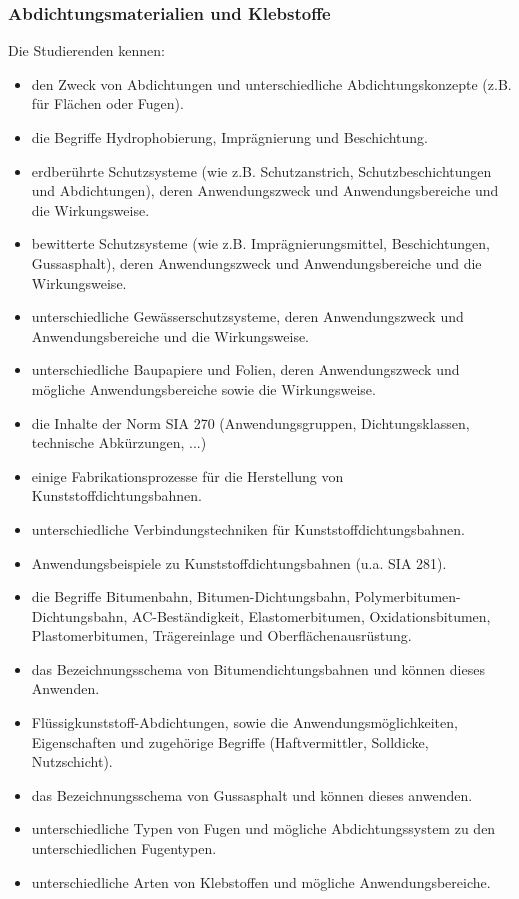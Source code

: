 \subsubsection*{Abdichtungsmaterialien und Klebstoffe}

Die Studierenden kennen: 

\begin{itemize}[noitemsep]
	\item den Zweck von Abdichtungen und unterschiedliche Abdichtungskonzepte (z.B. für Flächen oder Fugen).
	\item die Begriffe Hydrophobierung, Imprägnierung und Beschichtung.
	\item erdberührte Schutzsysteme (wie z.B. Schutzanstrich, Schutzbeschichtungen und Abdichtungen), deren Anwendungszweck und Anwendungsbereiche und die Wirkungsweise.
	\item bewitterte Schutzsysteme (wie z.B. Imprägnierungsmittel, Beschichtungen, Gussasphalt), deren Anwendungszweck und Anwendungsbereiche und die Wirkungsweise.
	\item unterschiedliche Gewässerschutzsysteme, deren Anwendungszweck und Anwendungsbereiche und die Wirkungsweise.
	\item unterschiedliche Baupapiere und Folien, deren Anwendungszweck und mögliche Anwendungsbereiche sowie die Wirkungsweise.
	\item die Inhalte der Norm SIA 270 (Anwendungsgruppen, Dichtungsklassen, technische Abkürzungen, ...)
	\item einige Fabrikationsprozesse für die Herstellung von Kunststoffdichtungsbahnen.
	\item unterschiedliche Verbindungstechniken für Kunststoffdichtungsbahnen.
	\item Anwendungsbeispiele zu Kunststoffdichtungsbahnen (u.a. SIA 281).
	\item die Begriffe Bitumenbahn, Bitumen-Dichtungsbahn, Polymerbitumen-Dichtungsbahn, AC-Be\-ständig\-keit, Elastomerbitumen, Oxidationsbitumen, Plastomerbitumen, Träger\-einlage und Ob\-erflächenausrüstung.
	\item das Bezeichnungsschema von Bitumendichtungsbahnen und können dieses Anwenden.
	\item Flüssigkunststoff-Abdichtungen, sowie die Anwendungsmöglichkeiten, Eigenschaften und zugehörige Begriffe (Haftvermittler, Solldicke, Nutzschicht).
	\item das Bezeichnungsschema von Gussasphalt und können dieses anwenden.
	\item unterschiedliche Typen von Fugen und mögliche Abdichtungssystem zu den unterschiedlichen Fugentypen.
	\item unterschiedliche Arten von Klebstoffen und mögliche Anwendungsbereiche.
\end{itemize}
